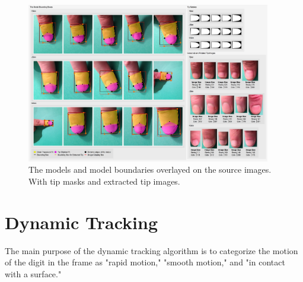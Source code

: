 \begin{figure}
  \centering
    \includegraphics[width=0.95\textwidth]{Chapter4/Figs/Model_Overlayed_Boundary_with_Tips.jpg}
    \caption{The models and model boundaries overlayed on the source images. With tip masks and extracted tip images.}\label{fig:ModelOverlayedBoundaryWithTips}
\end{figure}


\clearpage
\section{Dynamic Tracking}\label{sec:DynamicTracking}
The main purpose of the dynamic tracking algorithm is to categorize the motion of the digit in the frame as "rapid motion," "smooth motion," and "in contact with a surface."


